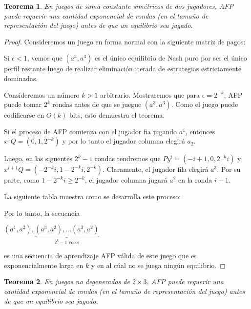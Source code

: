 \documentclass{article}
\newtheorem{theorem}{Teorema}
\begin{document}
\begin{theorem}
    En juegos de suma constante simétricos de dos jugadores, AFP puede requerir una cantidad exponencial de rondas
    (en el tamaño de representación del juego) antes de que un equilibrio sea jugado.
\end{theorem}

\begin{proof}
    Consideremos un juego en forma normal con la siguiente matriz de pagos:

    

    Si $\epsilon < 1$, vemos que $(a^3, a^3)$ es el único equilibrio de Nash puro
    por ser el único perfil restante luego de realizar eliminación iterada de estrategias estrictamente dominadas.

    Consideremos un número $k > 1$ arbitrario. Mostraremos que para $\epsilon = 2^{-k}$, AFP puede tomar $2^k$ rondas antes de que
    se juegue $(a^3, a^3)$. Como el juego puede codificarse en $O(k)$ bits, esto demuestra el teorema.

    Si el proceso de AFP comienza con el jugador fia jugando $a^1$, entonces $x^1Q = (0, 1, 2^{-k})$ y por lo tanto
    el jugador columna elegirá $a_2$.

    Luego, en las siguentes $2^k - 1$ rondas tendremos que $Py^i = (-i + 1, 0, 2^{-k}i)$ y $x^{i+1}Q = (-2^{-k}i, 1 - 2^{-k}i, 2^{-k})$.
    Claramente, el jugador fila elegirá $a^3$.
    Por su parte, como $1 - 2^{-k}i \ge 2^{-k}$, el jugador columna jugará $a^2$ en la ronda $i + 1$.

    La siguiente tabla muestra como se desarrolla este proceso:

    

    Por lo tanto, la secuencia

    \begin{center}
    \begin{math}
        (a^1, a^2), \underbrace{(a^3, a^2), ... (a^3, a^2)}_{\text{$2^k - 1$ veces}}
    \end{math}
    \end{center}

    es una secuencia de aprendizaje AFP válida de este juego que es exponencialmente larga en $k$ y en al cúal no se juega ningún equilibrio.
\end{proof}

\begin{theorem}
    En juegos no degenerados de $2 \times 3$, AFP puede requerir una cantidad exponencial de rondas
    (en el tamaño de representación del juego) antes de que un equilibrio sea jugado.
\end{theorem}
\end{document}
